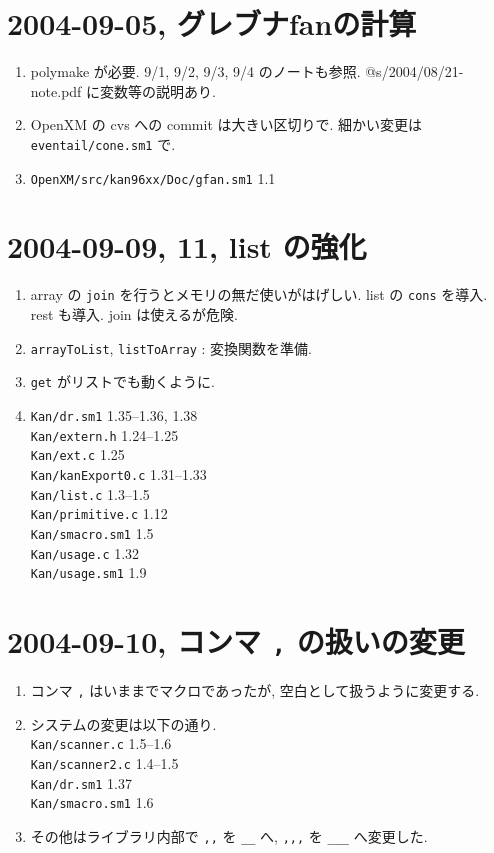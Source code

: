\documentclass{jarticle}
\begin{document}
\section{2004-09-05, グレブナfanの計算}
\begin{enumerate}
\item polymake が必要.  9/1, 9/2, 9/3, 9/4 のノートも参照.
@s/2004/08/21-note.pdf に変数等の説明あり.
\item OpenXM の cvs への commit は大きい区切りで. 
      細かい変更は {\tt eventail/cone.sm1} で.
\item {\tt OpenXM/src/kan96xx/Doc/gfan.sm1} 1.1
\end{enumerate}

\section{2004-09-09, 11, list の強化}
\begin{enumerate}
\item array の {\tt join} を行うとメモリの無だ使いがはげしい.
list の {\tt cons} を導入.  rest も導入. join は使えるが危険.
\item 
{\tt arrayToList}, {\tt listToArray} : 変換関数を準備.
\item {\tt get} がリストでも動くように.
\item {\tt Kan/dr.sm1} 1.35--1.36, 1.38 \\
{\tt Kan/extern.h} 1.24--1.25 \\
{\tt Kan/ext.c} 1.25 \\
{\tt Kan/kanExport0.c} 1.31--1.33 \\
{\tt Kan/list.c} 1.3--1.5 \\
{\tt Kan/primitive.c} 1.12 \\
{\tt Kan/smacro.sm1} 1.5 \\
{\tt Kan/usage.c} 1.32 \\
{\tt Kan/usage.sm1} 1.9
\end{enumerate}

\section{2004-09-10, コンマ {\tt ,} の扱いの変更}
\begin{enumerate}
\item  コンマ {\tt ,} はいままでマクロであったが, 空白として扱うように変更する.
\item  システムの変更は以下の通り. \\
{\tt Kan/scanner.c} 1.5--1.6 \\
{\tt Kan/scanner2.c} 1.4--1.5 \\
{\tt Kan/dr.sm1} 1.37 \\
{\tt Kan/smacro.sm1} 1.6 
\item その他はライブラリ内部で {\tt ,,} を {\tt \_\_} へ,
{\tt ,,,} を {\tt \_\_\_} へ変更した.
\end{enumerate}
\end{document}
